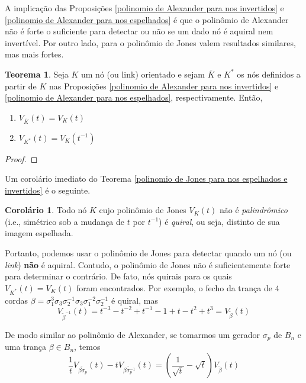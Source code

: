 \documentclass[a4paper,portuguese,11pt,twoside, leqno]{book}
\theoremstyle{definition}
\newtheorem{theorem}{Teorema}[section]
\newtheorem{corollary}{Corolário}[theorem]
\begin{document}
	\par\vspace{0.3cm} A implicação das Proposições \eqref{polinomio de Alexander para nos invertidos} e \eqref{polinomio de Alexander para nos espelhados} é que o polinômio de Alexander não é forte o suficiente para detectar ou não se um dado nó é aquiral nem invertível. Por outro lado, para o polinômio de Jones valem resultados similares, mas mais fortes.
	\begin{theorem}
		\label{polinomio de Jones para nos espelhados e invertidos}
		Seja $K$ um nó (ou link) orientado e sejam $\overline{K}$ e $K^\ast$ os nós definidos a partir de $K$ nas Proposições \eqref{polinomio de Alexander para nos invertidos} e \eqref{polinomio de Alexander para nos espelhados}, respectivamente. Então,
		\begin{enumerate}
			\item $V_{\overline{K}}(t) = V_K(t)$ 
			\item $V_{K^\ast}(t) = V_K(t^{-1})$
		\end{enumerate}
	\end{theorem}
	\begin{proof}
		
	\end{proof}
	\par\vspace{0.3cm} Um corolário imediato do Teorema \eqref{polinomio de Jones para nos espelhados e invertidos} é o seguinte.
	\begin{corollary}
		\label{simetria polinomio de Jones}
		Todo nó $K$ cujo polinômio de Jones $V_K(t)$ não é \textit{palindrômico} (i.e., simétrico sob a mudança de $t$ por $t^{-1}$) é \textit{quiral}, ou seja, distinto de sua imagem espelhada.
	\end{corollary}
	\par\vspace{0.3cm} Portanto, podemos usar o polinômio de Jones para detectar quando um nó (ou \textit{link}) \textbf{não} é aquiral. Contudo, o polinômio de Jones não é suficientemente forte para determinar o contrário. De fato, nós quirais para os quais $V_{K^\ast}(t) = V_K(t)$ foram encontrados. Por exemplo, o fecho da trança de $4$ cordas $\beta = \sigma_1^3\sigma_3\sigma_2^{-1}\sigma_3\sigma_1^{-2}\sigma_2^{-1}$ é quiral, mas 
	\begin{equation*}
	V_{\widetilde{\beta}^{-1}}(t) = t^{-3} - t^{-2} + t^{-1} - 1 + t - t^2 + t^3 = V_{\widetilde{\beta}}(t)
	\end{equation*}
	\par\vspace{0.3cm} De modo similar ao polinômio de Alexander, se tomarmos um gerador $\sigma_p$ de $B_n$ e uma trança $\beta\in B_n$, temos
	\begin{equation*}
	\frac{1}{t}V_{\widetilde{\beta\sigma_p}}(t) - tV_{\widetilde{\beta\sigma_p^{-1}}}(t) = \left( \frac{1}{\sqrt{t}} - \sqrt{t}\right)V_{\widetilde{\beta}}(t)
	\end{equation*}
\end{document}
